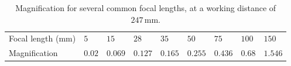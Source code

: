 \begin{table}[!h]
  \centering
  \caption[Magnification for several common focal lengths]{Magnification for several common focal lengths, at a working distance of $247\,\mathrm{mm}$.}
  \label{tab:lens_magnification}
  \begin{tabularx}{1\textwidth}{lllllllll}
    \toprule
    Focal length ($\mathrm{mm}$) & $5$    & $15$    & $28$    & $35$    & $50$    & $75$    & $100$  & $150$   \\
    Magnification     & $0.02$ & $0.069$ & $0.127$ & $0.165$ & $0.255$ & $0.436$ & $0.68$ & $1.546$ \\
    \bottomrule
  \end{tabularx}
\end{table}